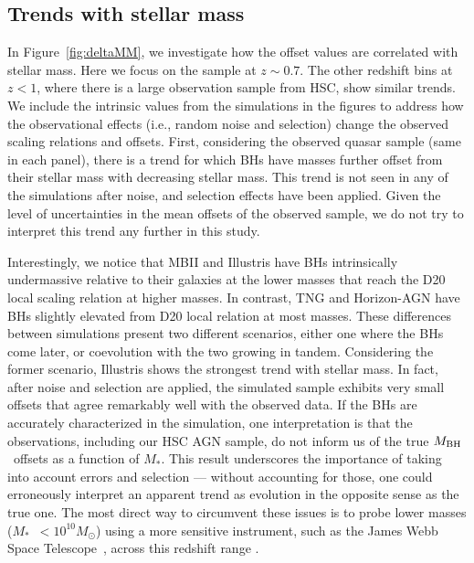 \documentclass[twocolumn]{aastex631}
\def\smass{{$M_*$}}
\def\mbh{$M_{\rm BH}$}
\begin{document}
\subsection{Trends with stellar mass}
In Figure~\ref{fig:deltaMM}, we investigate how the offset values are correlated with stellar mass. Here we focus on the sample at $z\sim0.7$. The other redshift bins at $z<1$, where there is a large observation sample from HSC, show similar trends. We include the intrinsic values from the simulations in the figures to address how the observational effects (i.e., random noise and selection) change the observed scaling relations and offsets. First, considering the observed quasar sample (same in each panel), there is a trend for which BHs have masses further offset from their stellar mass with decreasing stellar mass. This trend is not seen in any of the simulations after noise, and selection effects have been applied. Given the level of uncertainties in the mean offsets of the observed sample, we do not try to interpret this trend any further in this study.

Interestingly, we notice that MBII and Illustris have BHs intrinsically undermassive relative to their galaxies at the lower masses that reach the D20 local scaling relation at higher masses. In contrast, TNG and Horizon-AGN have BHs slightly elevated from D20 local relation at most masses. These differences between simulations present two different scenarios, either one where the BHs come later, or coevolution with the two growing in tandem. Considering the former scenario, Illustris shows the strongest trend with stellar mass. In fact, after noise and selection are applied, the simulated sample exhibits very small offsets that agree remarkably well with the observed data. If the BHs are accurately characterized in the simulation, one interpretation is that the observations, including our HSC AGN sample, do not inform us of the true \mbh\ offsets as a function of \smass.  This result underscores the importance of taking into account errors and selection --- without accounting for those, one could erroneously interpret an apparent trend as evolution in the opposite sense as the true one. The most direct way to circumvent these issues is to probe lower masses (\smass\  $<10^{10}M_{\odot}$) using a more sensitive instrument, such as the James Webb Space Telescope~\citep{Habouzit2022}, across this redshift range \citep[see also][]{2011MNRAS.417.2085V}.
\end{document}
